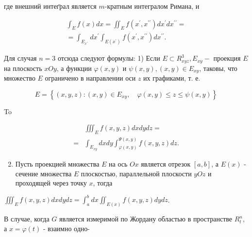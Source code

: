 \documentclass[10pt]{article}
\begin{document}
где внешний интег̈рал является $m$-кратным интегралом Римана, и



\[

\begin{gathered}

\int_{E} f(x) d x=\iint_{E} f\left(x^{\prime}, x^{\prime \prime}\right) d x^{\prime} d x^{\prime \prime}= \\

=\int_{E_{x^{\prime \prime}}} d x^{\prime} \int_{E\left(x^{\prime}\right)} f\left(x^{\prime}, x^{\prime \prime}\right) d x^{\prime \prime} .

\end{gathered}

\]



Для случая $n=3$ отсюда следуют формулы: 1) Если $E \subset R_{x y z}^{3}, E_{x y}-$ проекция $E$ на плоскость $x O y$, а функции $\varphi(x, y)$ и $\psi(x, y),(x, y) \in E_{x y}$, таковы, что множество $E$ ограничено в направлении оси $z$ их графиками, т. е.



\[

E=\left\{(x, y, z):(x, y) \in E_{x y}, \quad \varphi(x, y) \leqslant z \leqslant \psi(x, y)\right\}

\]



To



\[

\begin{aligned}

& \iiint_{E} f(x, y, z) d x d y d z= \\

= & \int_{E_{x y}} d x d y \int_{\varphi(x, y)}^{\Psi(x, y)} f(x, y, z) d z .

\end{aligned}

\]



\begin{enumerate}

  \setcounter{enumi}{1}

  \item Пусть проекцией множества $E$ на ось $O x$ является отрезок $[a, b]$, а $E(x)$ - сечение множества $E$ плоскостью, параллельной плоскости $y O z$ и проходящей через точку $x$, тогда

\end{enumerate}



$\iiint_{E} f(x, y, z) d x d y d z=\int_{a}^{b} d x \iint_{E(x)} f(x, y, z) d y d z$.



В случае, когда $G$ является измеримой по Жордану областью в пространстве $R_{t}^{n}$, а $x=\varphi(t)$ - взаимно одно-
\end{document}
